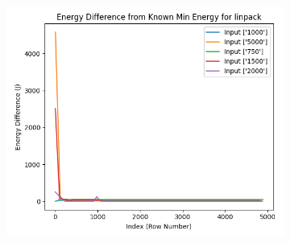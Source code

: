 \documentclass[times, 10pt,twocolumn]{article}
\begin{document}
\begin{figure}[ht]
\begin{subfigure}[b]{0.3\textwidth}
     \caption{}
     \label{fig:linpack_energy_diff}
   \end{subfigure}
   \hfill
   \begin{subfigure}[b]{0.3\textwidth}
      \includegraphics[width=\textwidth]{imgs/final_experiment_plots/model_analysis/measurement_data_analysis/linpack_compare_min.png}
     \caption{}
     \label{fig:linpack_compare_min}
   \end{subfigure}
   

\end{figure}
\end{document}
